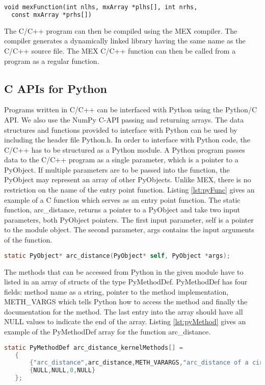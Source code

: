 \begin{lstlisting}[float,language=lisp, label={lst:mexFunc}, caption={Function signature of mexFunction}]
void mexFunction(int nlhs, mxArray *plhs[], int nrhs, 
  const mxArray *prhs[])
\end{lstlisting}

The C/C++ program can then be compiled using the MEX compiler. The compiler generates a dynamically linked library having the same name as the C/C++ source file. The MEX C/C++ function can then be called from a \matlab program as a regular \matlab function. 

\subsection{C APIs for Python}
Programs written in C/C++ can be interfaced with Python using the Python/C\cite{pyc} API. We also use the NumPy C-API\cite{numpyc} passing and returning arrays. The data structures and functions provided to interface with Python can be used by including the header file \textsf{Python.h}. In order to interface with Python code, the C/C++ has to be structured as a Python module. 
A Python program passes data to the C/C++ program as a single parameter, which is a pointer to a PyObject. If multiple parameters are to be passed into the function, the PyObject may represent an array of other PyObjects. Unlike MEX, there is no restriction on the name of the entry point function. Listing \ref{lst:pyFunc} gives an example of a C function which serves as an entry point function. The static function, arc\_distance, returns a pointer to a PyObject and take two input parameters, both PyObject pointers. The first input parameter, \textsf{self} is a pointer to the module object. The second parameter, \textsf{args} contains the input arguments of the function. 
\begin{lstlisting}[float,language=C, label={lst:pyFunc}, caption={Signature of a function that can be called from Python}]
  static PyObject* arc_distance(PyObject* self, PyObject *args); 
\end{lstlisting}

The methods that can be accessed from Python in the given module have to listed in an array of structs of the type PyMethodDef. PyMethodDef has four fields: method name as a string, pointer to the method implementation, METH\_VARGS which tells Python how to access the method and finally the documentation for the method. The last entry into the array should have all NULL values to indicate the end of the array. Listing \ref{lst:pyMethod} gives an example of the PyMethodDef array for the function arc\_distance. 
\begin{lstlisting}[language=C, label={lst:pyMethod}, caption={An Example of the PyMethodDef struct }]
static PyMethodDef arc_distance_kernelMethods[] =
   {
       {"arc_distance",arc_distance,METH_VARARGS,"arc_distance of a circle. "},
       {NULL,NULL,0,NULL}
   };
\end{lstlisting}

